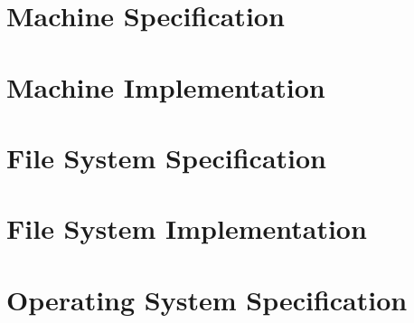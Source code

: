 \documentclass[a4paper,11pt]{report}
\begin{document}

%







\tableofcontents
\listoffigures


\part{Machine Specification}







\part{Machine Implementation}


\part{File System Specification}


\part{File System Implementation}


\part{Operating System Specification}










\appendix



\clearpage
{}
\printindex

\clearpage
{}
{}


\end{document}
